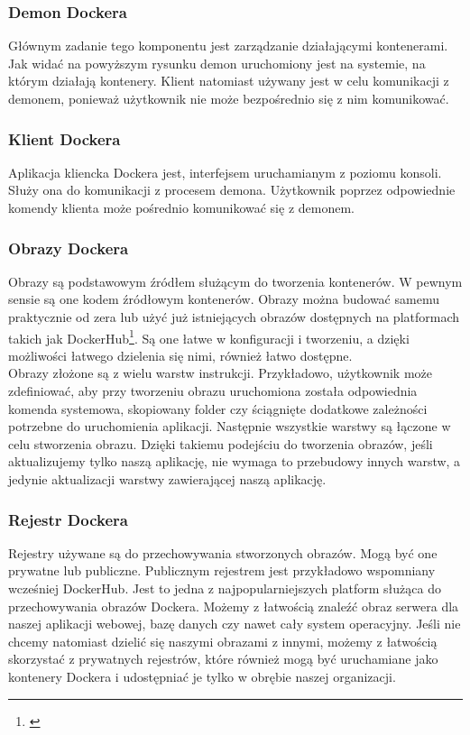\documentclass[12pt]{report}
\let\Oldsubsubsection\subsubsection
\renewcommand{\subsubsection}{\FloatBarrier\Oldsubsubsection}
\begin{document}
\subsubsection{Demon Dockera}
Głównym zadanie tego komponentu jest zarządzanie działającymi kontenerami. Jak widać na powyższym rysunku demon uruchomiony jest na systemie, na którym działają kontenery. Klient natomiast używany jest w celu komunikacji z demonem, ponieważ użytkownik nie może bezpośrednio się z nim komunikować.

\subsubsection{Klient Dockera}
Aplikacja kliencka Dockera jest, interfejsem uruchamianym z poziomu konsoli. Służy ona do komunikacji z procesem demona. Użytkownik poprzez odpowiednie komendy klienta może pośrednio komunikować się z demonem.

\subsubsection{Obrazy Dockera}
Obrazy są podstawowym źródłem służącym do tworzenia kontenerów. W pewnym sensie są one kodem źródłowym kontenerów. Obrazy można budować samemu praktycznie od zera lub użyć już istniejących obrazów dostępnych na platformach takich jak DockerHub\footnote{\cite{dockerhub}}. Są one łatwe w konfiguracji i tworzeniu, a dzięki możliwości łatwego dzielenia się nimi, również łatwo dostępne. \\
\indent Obrazy złożone są z wielu warstw instrukcji. Przykładowo, użytkownik może zdefiniować, aby przy tworzeniu obrazu uruchomiona została odpowiednia komenda systemowa, skopiowany folder czy ściągnięte dodatkowe zależności potrzebne do uruchomienia aplikacji. Następnie wszystkie warstwy są łączone w celu stworzenia obrazu. Dzięki takiemu podejściu do tworzenia obrazów, jeśli aktualizujemy tylko naszą aplikację, nie wymaga to przebudowy innych warstw, a jedynie aktualizacji warstwy zawierającej naszą aplikację.

\subsubsection{Rejestr Dockera}
Rejestry używane są do przechowywania stworzonych obrazów. Mogą być one prywatne lub publiczne. Publicznym rejestrem jest przykładowo wspomniany wcześniej DockerHub. Jest to jedna z najpopularniejszych platform służąca do przechowywania obrazów Dockera. Możemy z łatwością znaleźć obraz serwera dla naszej aplikacji webowej, bazę danych czy nawet cały system operacyjny. Jeśli nie chcemy natomiast dzielić się naszymi obrazami z innymi, możemy z łatwością skorzystać z prywatnych rejestrów, które również mogą być uruchamiane jako kontenery Dockera i udostępniać je tylko w obrębie naszej organizacji.
\end{document}
